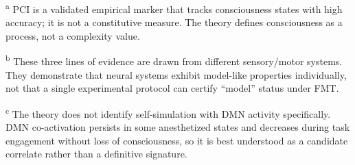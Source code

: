 \documentclass[12pt]{article}
\begin{document}
\textsuperscript{a} PCI is a validated empirical marker that tracks consciousness states with high accuracy; it is not a constitutive measure. The theory defines consciousness as a process, not a complexity value.

\textsuperscript{b} These three lines of evidence are drawn from different sensory/motor systems. They demonstrate that neural systems exhibit model-like properties individually, not that a single experimental protocol can certify ``model'' status under FMT.

\textsuperscript{c} The theory does not identify self-simulation with DMN activity specifically. DMN co-activation persists in some anesthetized states and decreases during task engagement without loss of consciousness, so it is best understood as a candidate correlate rather than a definitive signature.
\end{document}
